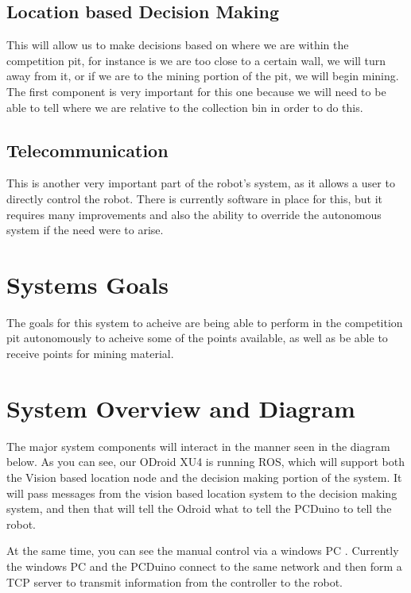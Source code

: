 \subsection{Location based Decision Making}
This will allow us to make decisions based on where we are within the competition pit, for instance is we are too close to a certain wall, we will turn away from it, or if we are to the mining portion of the pit, we will begin mining. The first component is very important for this one because we will need to be able to tell where we are relative to the collection bin in order to do this.
\newpage
\subsection{Telecommunication}
This is another very important part of the robot's system, as it allows a user to directly control the robot. There is currently software in place for this, but it requires many improvements and also the ability to override the autonomous system if the need were to arise.

\section{Systems Goals}
The goals for this system to acheive are being able to perform in the competition pit autonomously to acheive some of the points available, as well as be able to receive points for mining material.

\section{System Overview and Diagram}
The major system components will interact in the manner seen in the diagram below. As you can see, our ODroid XU4 is running ROS, which will support both the Vision based location node and the decision making portion of the system. It will pass messages from the vision based location system to the decision making system, and then that will tell the Odroid what to tell the PCDuino to tell the robot. 

At the same time, you can see the manual control via a windows PC . Currently the windows PC and the PCDuino connect to the same network and then form a TCP server to transmit information from the controller to the robot.


